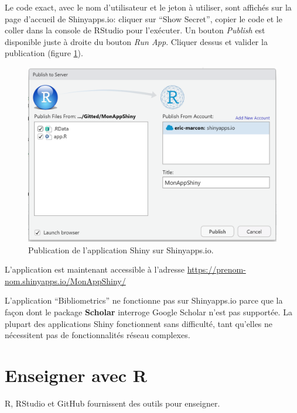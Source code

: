 \documentclass[
  12pt,
  french,
  a4paper,
  extrafontsizes,onecolumn,openright
  ]{memoir}
\begin{document}
\normalsize

Le code exact, avec le nom d'utilisateur et le jeton à utiliser, sont affichés sur la page d'accueil de Shinyapps.io: cliquer sur \enquote{Show Secret}, copier le code et le coller dans la console de RStudio pour l'exécuter.
Un bouton \emph{Publish} est disponible juste à droite du bouton \emph{Run App}.
Cliquer dessus et valider la publication (figure \ref{fig:shiny-publish}).



\scriptsize

\begin{figure}

{\centering \includegraphics[width=0.8\linewidth]{images/shiny-publish} 

}

\caption{Publication de l'application Shiny sur Shinyapps.io.}\label{fig:shiny-publish}
\end{figure}

\normalsize

L'application est maintenant accessible à l'adresse \url{https://prenom-nom.shinyapps.io/MonAppShiny/}

L'application \enquote{Bibliometrics} ne fonctionne pas sur Shinyapps.io parce que la façon dont le package \textbf{Scholar} interroge Google Scholar n'est pas supportée.
La plupart des applications Shiny fonctionnent sans difficulté, tant qu'elles ne nécessitent pas de fonctionnalités réseau complexes.

\hypertarget{chap:enseigner}{%
\chapter{Enseigner avec R}\label{chap:enseigner}}

R, RStudio et GitHub fournissent des outils pour enseigner.
\end{document}
